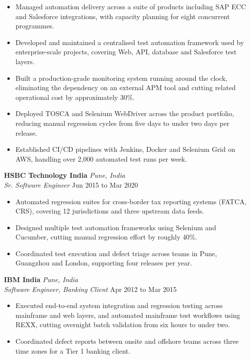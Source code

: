 \documentclass[11pt, a4paper]{article}
\newcommand{\roleheader}[4]{%
    \noindent\textbf{#1} \hfill \textit{#2}\\
    \textit{#3} \hfill #4\par\vspace{2pt}
}
\begin{document}
\begin{itemize}
    \item Managed automation delivery across a suite of products including SAP ECC and Salesforce integrations, with capacity planning for eight concurrent programmes.
    \item Developed and maintained a centralised test automation framework used by enterprise-scale projects, covering Web, API, database and Salesforce test layers.
    \item Built a production-grade monitoring system running around the clock, eliminating the dependency on an external APM tool and cutting related operational cost by approximately 30\%.
    \item Deployed TOSCA and Selenium WebDriver across the product portfolio, reducing manual regression cycles from five days to under two days per release.
    \item Established CI/CD pipelines with Jenkins, Docker and Selenium Grid on AWS, handling over 2{,}000 automated test runs per week.
\end{itemize}

\roleheader{HSBC Technology India}{Pune, India}{Sr. Software Engineer}{Jun 2015 to Mar 2020}

\begin{itemize}
    \item Automated regression suites for cross-border tax reporting systems (FATCA, CRS), covering 12 jurisdictions and three upstream data feeds.
    \item Designed multiple test automation frameworks using Selenium and Cucumber, cutting manual regression effort by roughly 40\%.
    \item Coordinated test execution and defect triage across teams in Pune, Guangzhou and London, supporting four releases per year.
\end{itemize}

\roleheader{IBM India}{Pune, India}{Software Engineer, Banking Client}{Apr 2012 to Mar 2015}

\begin{itemize}
    \item Executed end-to-end system integration and regression testing across mainframe and web layers, and automated mainframe test workflows using REXX, cutting overnight batch validation from six hours to under two.
    \item Coordinated defect reports between onsite and offshore teams across three time zones for a Tier 1 banking client.
\end{itemize}
\end{document}
